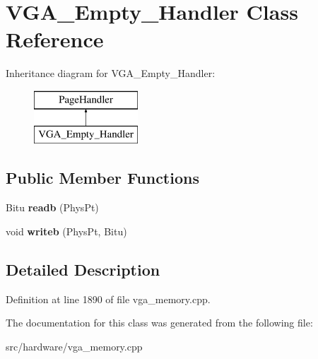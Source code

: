 \hypertarget{classVGA__Empty__Handler}{\section{V\-G\-A\-\_\-\-Empty\-\_\-\-Handler Class Reference}
\label{classVGA__Empty__Handler}
}
Inheritance diagram for V\-G\-A\-\_\-\-Empty\-\_\-\-Handler\-:\begin{figure}[H]
\begin{center}
\leavevmode
\includegraphics[height=2.000000cm]{classVGA__Empty__Handler}
\end{center}
\end{figure}
\subsection*{Public Member Functions}
\begin{DoxyCompactItemize}
\item 
\hypertarget{classVGA__Empty__Handler_ae84a276c3421d6db0f08b48d81692905}{Bitu {\bfseries readb} (Phys\-Pt)}\label{classVGA__Empty__Handler_ae84a276c3421d6db0f08b48d81692905}

\item 
\hypertarget{classVGA__Empty__Handler_a291f19e5b04518175d51cb6089424004}{void {\bfseries writeb} (Phys\-Pt, Bitu)}\label{classVGA__Empty__Handler_a291f19e5b04518175d51cb6089424004}

\end{DoxyCompactItemize}


\subsection{Detailed Description}


Definition at line 1890 of file vga\-\_\-memory.\-cpp.



The documentation for this class was generated from the following file\-:\begin{DoxyCompactItemize}
\item 
src/hardware/vga\-\_\-memory.\-cpp\end{DoxyCompactItemize}
